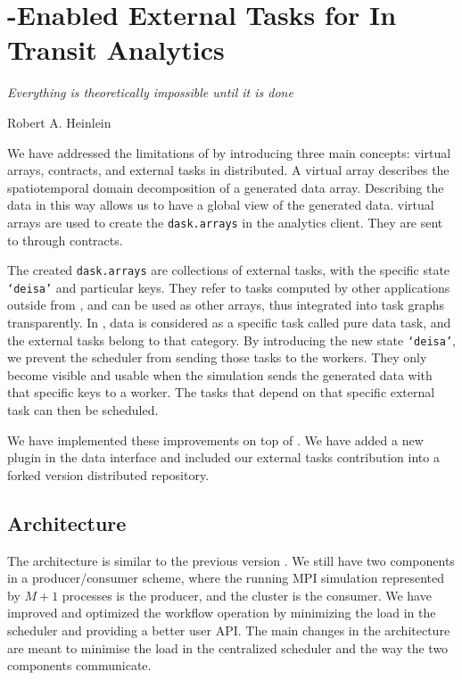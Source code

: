 \newpage




\chapter{\dask-Enabled External Tasks for In Transit Analytics}\label{deetitachapter}
\vspace{20mm}

\epigraph{\textit{Everything is theoretically impossible until it is done}} {Robert A. Heinlein}
\vfill

We have addressed the limitations of \deisa by introducing three main concepts: \deisa virtual arrays, contracts, and external tasks in \dask distributed. A \deisa virtual array describes the spatiotemporal domain decomposition of a generated data array. Describing the data in this way allows us to have a global view of the generated data. \deisa virtual arrays are used to create the \texttt{dask.arrays} in the analytics client. They are sent to \dask through contracts. 

The created \texttt{dask.arrays} are collections of external tasks, with the specific state \texttt{‘deisa’} and particular keys. They refer to tasks computed by other applications outside from \dask, and can be used as other \dask arrays, thus integrated into \dask task graphs transparently. In \dask, data is considered as a specific task called pure data task, and the external tasks belong to that category. By introducing the new state \texttt{‘deisa’}, we prevent the scheduler from sending those tasks to the workers. They only become visible and usable when the simulation sends the generated data with that specific keys to a worker. The tasks that depend on that specific external task can then be scheduled. 

We have implemented these improvements on top of \deisa\cite{deisa}. We have added a new \deisa plugin in the \pdi data interface and included our external tasks contribution into a forked version \dask distributed repository\cite{amal_distributed_2022}. 

\section{Architecture}

The architecture is similar to the previous version \deisa. We still have two components in a producer/consumer scheme, where the running MPI simulation represented by $M+1$ processes is the producer, and the \dask cluster is the consumer. We have improved and optimized the workflow operation by minimizing the load in the scheduler and providing a better user API. The main changes in the architecture are meant to minimise the load in the centralized scheduler and the way the two components communicate.

